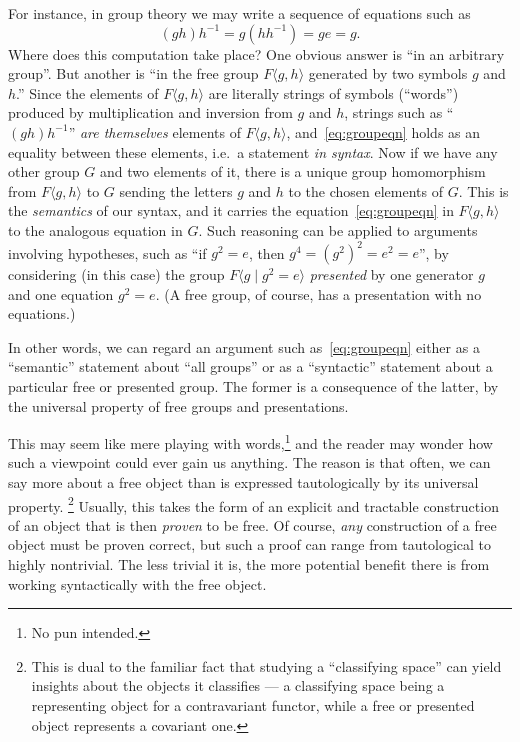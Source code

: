\documentclass[10pt]{article}
\numberwithin{equation}{section}
\begin{document}
For instance, in group theory we may write a sequence of equations such as
\begin{equation}
  (g h) h^{-1} = g (h h^{-1}) = g e = g.\label{eq:groupeqn}
\end{equation}
Where does this computation take place?
One obvious answer is ``in an arbitrary group''.
But another is ``in the free group $F\langle g,h\rangle$ generated by two symbols $g$ and $h$.''
Since the elements of $F\langle g,h\rangle$ are literally strings of symbols (``words'') produced by multiplication and inversion from $g$ and $h$, strings such as ``$(g h)h^{-1}$'' \emph{are themselves} elements of $F\langle g,h\rangle$, and~\eqref{eq:groupeqn} holds as an equality between these elements, i.e.\ a statement \emph{in syntax}.
Now if we have any other group $G$ and two elements of it, there is a unique group homomorphism from $F\langle g,h\rangle$ to $G$ sending the letters $g$ and $h$ to the chosen elements of $G$.
This is the \emph{semantics} of our syntax, and it carries the equation~\eqref{eq:groupeqn} in $F\langle g,h\rangle$ to the analogous equation in $G$.
Such reasoning can be applied to arguments involving hypotheses, such as ``if $g^2 = e$, then $g^4 = (g^2)^2 = e^2 = e$'', by considering (in this case) the group $F\langle g \mid g^2=e\rangle$ \emph{presented} by one generator $g$ and one equation $g^2=e$.
(A free group, of course, has a presentation with no equations.)

In other words, we can regard an argument such as~\eqref{eq:groupeqn} either as a ``semantic'' statement about ``all groups'' or as a ``syntactic'' statement about a particular free or presented group.
The former is a consequence of the latter, by the universal property of free groups and presentations.

This may seem like mere playing with words,\footnote{No pun intended.} and the reader may wonder how such a viewpoint could ever gain us anything.
The reason is that often, we can say more about a free object than is expressed tautologically by its universal property.%
\footnote{This is dual to the familiar fact that studying a ``classifying space'' can yield insights about the objects it classifies --- a classifying space being a representing object for a contravariant functor, while a free or presented object represents a covariant one.}
Usually, this takes the form of an explicit and tractable construction of an object that is then \emph{proven} to be free.
Of course, \emph{any} construction of a free object must be proven correct, but such a proof can range from tautological to highly nontrivial.
The less trivial it is, the more potential benefit there is from working syntactically with the free object.
\end{document}
